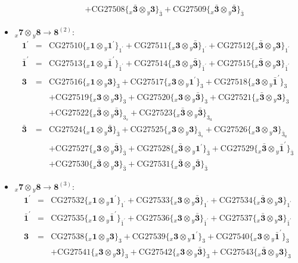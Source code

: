 \documentclass[english]{article}
\newcommand{\rep}[1]{\mathbf{#1}}
\newcommand{\repx}[2]{{}_{#2}\mathbf{#1}}
\newcommand{\subcg}[3]{\big\{ \repx{#1}{x}\otimes\repx{#2}{y}\big\}^{}_{#3}}
\begin{document}
\begin{itemize}
\begin{eqnarray*}
 & & +\text{CG27508}\subcg{\bar{3}}{3}{\bar{3}}+\text{CG27509}\subcg{\bar{3}}{\bar{3}}{\bar{3}}
\end{eqnarray*}
\item $\repx{7}{x}\otimes\repx{8}{y}\to\rep{8}^{(2)}$:
\begin{eqnarray*}
\rep{1^{\prime}} &=& \text{CG27510}\subcg{1}{1^{\prime}}{1^{\prime}}+\text{CG27511}\subcg{3}{\bar{3}}{1^{\prime}}+\text{CG27512}\subcg{\bar{3}}{3}{1^{\prime}}
\\
\rep{\bar{1}^{\prime}} &=& \text{CG27513}\subcg{1}{\bar{1}^{\prime}}{\bar{1}^{\prime}}+\text{CG27514}\subcg{3}{\bar{3}}{\bar{1}^{\prime}}+\text{CG27515}\subcg{\bar{3}}{3}{\bar{1}^{\prime}}
\\
\rep{3} &=& \text{CG27516}\subcg{1}{3}{3}+\text{CG27517}\subcg{3}{1^{\prime}}{3}+\text{CG27518}\subcg{3}{\bar{1}^{\prime}}{3} \\ 
 & & +\text{CG27519}\subcg{3}{3}{3}+\text{CG27520}\subcg{3}{\bar{3}}{3}+\text{CG27521}\subcg{\bar{3}}{3}{3} \\ 
 & & +\text{CG27522}\subcg{\bar{3}}{\bar{3}}{3_{s}}+\text{CG27523}\subcg{\bar{3}}{\bar{3}}{3_{a}}
\\
\rep{\bar{3}} &=& \text{CG27524}\subcg{1}{\bar{3}}{\bar{3}}+\text{CG27525}\subcg{3}{3}{\bar{3}_{s}}+\text{CG27526}\subcg{3}{3}{\bar{3}_{a}} \\ 
 & & +\text{CG27527}\subcg{3}{\bar{3}}{\bar{3}}+\text{CG27528}\subcg{\bar{3}}{1^{\prime}}{\bar{3}}+\text{CG27529}\subcg{\bar{3}}{\bar{1}^{\prime}}{\bar{3}} \\ 
 & & +\text{CG27530}\subcg{\bar{3}}{3}{\bar{3}}+\text{CG27531}\subcg{\bar{3}}{\bar{3}}{\bar{3}}
\end{eqnarray*}
\item $\repx{7}{x}\otimes\repx{8}{y}\to\rep{8}^{(3)}$:
\begin{eqnarray*}
\rep{1^{\prime}} &=& \text{CG27532}\subcg{1}{1^{\prime}}{1^{\prime}}+\text{CG27533}\subcg{3}{\bar{3}}{1^{\prime}}+\text{CG27534}\subcg{\bar{3}}{3}{1^{\prime}}
\\
\rep{\bar{1}^{\prime}} &=& \text{CG27535}\subcg{1}{\bar{1}^{\prime}}{\bar{1}^{\prime}}+\text{CG27536}\subcg{3}{\bar{3}}{\bar{1}^{\prime}}+\text{CG27537}\subcg{\bar{3}}{3}{\bar{1}^{\prime}}
\\
\rep{3} &=& \text{CG27538}\subcg{1}{3}{3}+\text{CG27539}\subcg{3}{1^{\prime}}{3}+\text{CG27540}\subcg{3}{\bar{1}^{\prime}}{3} \\ 
 & & +\text{CG27541}\subcg{3}{3}{3}+\text{CG27542}\subcg{3}{\bar{3}}{3}+\text{CG27543}\subcg{\bar{3}}{3}{3} \\ 

\end{eqnarray*}
\end{itemize}
\end{document}
